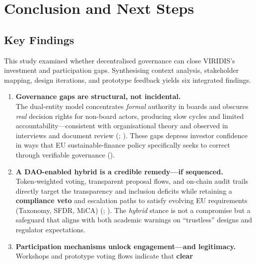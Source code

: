 \documentclass[
  english,
  12pt,
  oneside,
  open=any]{scrbook}
\begin{document}
\chapter{Conclusion and Next Steps}\label{sec-conclusion}

\section{Key Findings}\label{sec-findings}

This study examined whether decentralised governance can close VIRIDIS's
investment and participation gaps. Synthesising context analysis,
stakeholder mapping, design iterations, and prototype feedback yields
six integrated findings.

\begin{enumerate}
\def\labelenumi{\arabic{enumi}.}
\item
  \textbf{Governance gaps are structural, not incidental.}\\
  The dual-entity model concentrates \emph{formal} authority in boards
  and obscures \emph{real} decision rights for non-board actors,
  producing slow cycles and limited accountability---consistent with
  organisational theory and observed in interviews and document review
  (;
  ). These
  gaps depress investor confidence in ways that EU sustainable-finance
  policy specifically seeks to correct through verifiable governance
  ().
\item
  \textbf{A DAO-enabled hybrid is a credible remedy---if sequenced.}\\
  Token-weighted voting, transparent proposal flows, and on-chain audit
  trails directly target the transparency and inclusion deficits while
  retaining a \textbf{compliance veto} and escalation paths to satisfy
  evolving EU requirements (Taxonomy, SFDR, MiCA)
  (;
  ).
  The \emph{hybrid} stance is not a compromise but a safeguard that
  aligns with both academic warnings on ``trustless'' designs and
  regulator expectations.
\item
  \textbf{Participation mechanisms unlock engagement---and
  legitimacy.}\\
  Workshops and prototype voting flows indicate that \textbf{clear
}
\end{enumerate}
\end{document}

